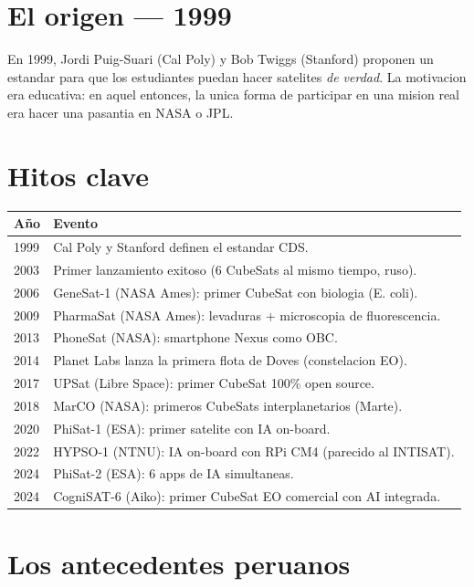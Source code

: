 \documentclass[11pt,a4paper,oneside,openright]{book}
\begin{document}
\section{El origen --- 1999}

En 1999, Jordi Puig-Suari (Cal Poly) y Bob Twiggs (Stanford) proponen un
estandar para que los estudiantes puedan hacer satelites \emph{de verdad}.
La motivacion era educativa: en aquel entonces, la unica forma de
participar en una mision real era hacer una pasantia en NASA o JPL.

\section{Hitos clave}

\begin{center}
\begin{tabular}{p{1.3cm}p{12cm}}
\toprule
\textbf{Año} & \textbf{Evento} \\
\midrule
1999  & Cal Poly y Stanford definen el estandar CDS. \\
2003  & Primer lanzamiento exitoso (6 CubeSats al mismo tiempo, ruso). \\
2006  & GeneSat-1 (NASA Ames): primer CubeSat con biologia (E. coli). \\
2009  & PharmaSat (NASA Ames): levaduras + microscopia de fluorescencia. \\
2013  & PhoneSat (NASA): smartphone Nexus como OBC. \\
2014  & Planet Labs lanza la primera flota de Doves (constelacion EO). \\
2017  & UPSat (Libre Space): primer CubeSat 100\% open source. \\
2018  & MarCO (NASA): primeros CubeSats interplanetarios (Marte). \\
2020  & PhiSat-1 (ESA): primer satelite con IA on-board. \\
2022  & HYPSO-1 (NTNU): IA on-board con RPi CM4 (parecido al INTISAT). \\
2024  & PhiSat-2 (ESA): 6 apps de IA simultaneas. \\
2024  & CogniSAT-6 (Aiko): primer CubeSat EO comercial con AI integrada. \\
\bottomrule
\end{tabular}
\end{center}

\section{Los antecedentes peruanos}
\end{document}
